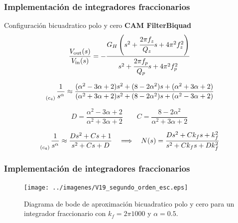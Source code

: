\documentclass[10pt]{beamer}
\begin{document}
	\begin{frame}
		\frametitle{Implementación de integradores fraccionarios}
		\begin{block}{Configuración bicuadratico polo y cero}
		\textbf{CAM FilterBiquad}
			\begin{equation}
		\frac{V_{\mathrm{out}} (s)}{V_{\mathrm{in}}(s)} = - \frac{G_{H} \left(  s^{2} + \cfrac{2 \pi f_{z}}{Q_{z}} s + 4 \pi^{2} f_{z}^{2} \right)}{s^{2} + \cfrac{2 \pi f_{p}}{Q_{p}}s + 4\pi^{2} f_{p}^{2} }
		\label{ec:CAM_biquad}
	\end{equation}
	
	\begin{equation}
		\genfrac{}{}{0pt}{0}{}{_{(c_{4})}} \frac{1}{s^{\alpha}} \approx \frac{(\alpha^{2} - 3\alpha + 2) s^{2} + (8 - 2 \alpha^{2})s + (\alpha^{2} + 3\alpha + 2) }{(\alpha^{2} + 3\alpha + 2) s^{2} + (8 - 2 \alpha^{2})s + (\alpha^{2} - 3\alpha + 2)}
		\label{ec:CFE_segundo_orden}
	\end{equation}
	
	\begin{equation}
		D = \frac{\alpha^{2} - 3 \alpha + 2}{\alpha^{2} + 3\alpha + 2} \qquad C = \frac{8 - 2 \alpha^{2}}{\alpha^{2} +  3 \alpha + 2}
	\end{equation}
	
	\begin{equation}
		\genfrac{}{}{0pt}{0}{}{_{(c_{4})}} \frac{1}{s^{\alpha}} \approx  \frac{D s^{2} + Cs + 1}{s^{2} + Cs + D} \quad \Longrightarrow \quad  N(s) = \frac{D s^{2} + C k_{f}s + k_{f}^{2}}{s^{2} + C k_{f}s + Dk_{f}^{2}}
		\label{ec:CFE_segundo_orden_2}
	\end{equation}
		\end{block}
	\end{frame}
	\begin{frame}
		\frametitle{Implementación de integradores fraccionarios}
		\begin{figure}[hbtp]
		\caption{Diagrama de bode de aproximación bicuadratico polo y cero para un integrador fraccionario con $k_{f} = 2\pi 1000$ y  $\alpha = 0.5$.} 
		\label{fig:V19_segundo_orden_esc}
		\centering
		\texttt{[image: ../imagenes/V19\_segundo\_orden\_esc.eps]}
	\end{figure}
	\end{frame}
\end{document}

